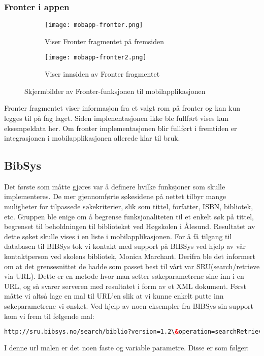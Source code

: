 \documentclass[../main.tex]{subfiles}
\begin{document}
\subsubsection{Fronter i appen}

\begin{figure}[H]
        \centering
        \begin{subfigure}[b]{0.3\textwidth}
                \centering
                \texttt{[image: mobapp-fronter.png]}
                \caption{Viser Fronter fragmentet på fremsiden}
        \end{subfigure}
        \quad
        \begin{subfigure}[b]{0.3\textwidth}
                \centering
                \texttt{[image: mobapp-fronter2.png]}
                \caption{Viser innsiden av Fronter fragmentet}
        \end{subfigure}
        \caption{Skjermbilder av Fronter-funksjonen til mobilapplikasjonen}
\end{figure}

Fronter fragmentet viser informasjon fra et valgt rom på fronter og kan kun legges til på fag laget. Siden implenentasjonen ikke ble fullført vises kun eksempeldata her. Om fronter implementasjonen blir fullført i fremtiden er integrasjonen i mobilapplikasjonen allerede klar til bruk. 

\subsection{BibSys}

Det første som måtte gjøres var å definere hvilke funksjoner som skulle implementeres. De mer gjennomførte søkesidene på nettet tilbyr mange muligheter for tilpassede søkekriterier, slik som tittel, forfatter, ISBN, bibliotek, etc.  Gruppen ble enige om å begrense funksjonaliteten til et enkelt søk på tittel, begrenset til beholdningen til biblioteket ved Høgskolen i Ålesund. Resultatet av dette søket skulle vises i en liste i mobilapplikasjonen.\newline
\newline
For å få tilgang til databasen til BIBSys tok vi kontakt med support på BIBSys ved hjelp av vår kontaktperson ved skolens bibliotek, Monica Marchant. Derifra ble det informert om at det grensesnittet de hadde som passet best til vårt var SRU(search/retrieve via URL). Dette er en metode hvor man setter søkeparametrene sine inn i en URL, og så svarer serveren med resultatet i form av et XML dokument.
\newline
Først måtte vi altså lage en mal til URL’en slik at vi kunne enkelt putte inn søkeparametrene vi ønsket. Ved hjelp av noen eksempler fra BIBSys sin support kom vi frem til følgende mal:
\newline
\begin{lstlisting}[language=HTML, frame=single]
http://sru.bibsys.no/search/biblio?version=1.2\&operation=searchRetrieve\&startRecord=1\&maximumRecords=10\&query=bs.bibkode=xb\%20AND\%20bs.tittel=ibsen
\end{lstlisting}
I denne url malen er det noen faste og variable parametre. Disse er som følger:
\end{document}
